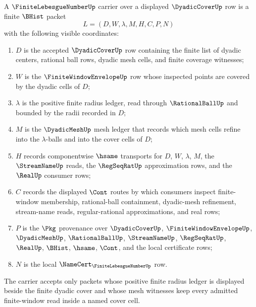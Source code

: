 \begin{definition}
\label{def:finite-lebesgue-number-carrier}
A $\FiniteLebesgueNumberUp$ carrier over a displayed $\DyadicCoverUp$ row is a finite $\BHist$ packet
$$
L=(D,W,\lambda,M,H,C,P,N)
$$
with the following visible coordinates:
\begin{enumerate}
\item $D$ is the accepted $\DyadicCoverUp$ row containing the finite list of dyadic centers, rational ball rows, dyadic mesh cells, and finite coverage witnesses;
\item $W$ is the $\FiniteWindowEnvelopeUp$ row whose inspected points are covered by the dyadic cells of $D$;
\item $\lambda$ is the positive finite radius ledger, read through $\RationalBallUp$ and bounded by the radii recorded in $D$;
\item $M$ is the $\DyadicMeshUp$ mesh ledger that records which mesh cells refine into the $\lambda$-balls and into the cover cells of $D$;
\item $H$ records componentwise $\hsame$ transports for $D$, $W$, $\lambda$, $M$, the $\StreamNameUp$ reads, the $\RegSeqRatUp$ approximation rows, and the $\RealUp$ consumer rows;
\item $C$ records the displayed $\Cont$ routes by which consumers inspect finite-window membership, rational-ball containment, dyadic-mesh refinement, stream-name reads, regular-rational approximations, and real rows;
\item $P$ is the $\Pkg$ provenance over $\DyadicCoverUp$, $\FiniteWindowEnvelopeUp$, $\DyadicMeshUp$, $\RationalBallUp$, $\StreamNameUp$, $\RegSeqRatUp$, $\RealUp$, $\BHist$, $\hsame$, $\Cont$, and the local certificate rows;
\item $N$ is the local $\NameCert_{\FiniteLebesgueNumberUp}$ row.
\end{enumerate}
The carrier accepts only packets whose positive finite radius ledger is displayed beside the finite dyadic cover and whose mesh witnesses keep every admitted finite-window read inside a named cover cell.
\end{definition}

